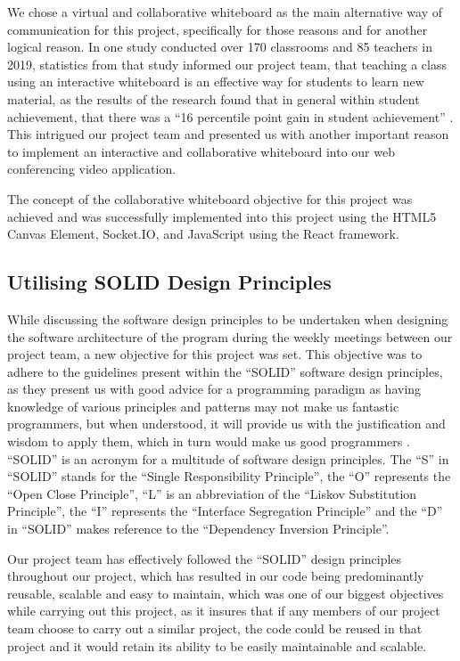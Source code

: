 We chose a virtual and collaborative whiteboard as the main alternative way of communication for this project, specifically for those reasons and for another logical reason. In one study conducted over 170 classrooms and 85 teachers in 2019, statistics from that study informed our project team, that teaching a class using an interactive whiteboard is an effective way for students to learn new material, as the results of the research found that in general within student achievement, that there was a “16 percentile point gain in student achievement” \cite{ marzano2009teaching}. This intrigued our project team and presented us with another important reason to implement an interactive and collaborative whiteboard into our web conferencing video application. 

The concept of the collaborative whiteboard objective for this project was achieved and was successfully implemented into this project using the HTML5 Canvas Element, Socket.IO, and JavaScript using the React framework.
\subsection{Utilising SOLID Design Principles}
While discussing the software design principles to be undertaken when designing the software architecture of the program during the weekly meetings between our project team, a new objective for this project was set. This objective was to adhere to the guidelines present within the “SOLID” software design principles, as they present us with good advice for a programming paradigm as having knowledge of various principles and patterns may not make us fantastic programmers, but when understood, it will provide us with the justification and wisdom to apply them, which in turn would make us good programmers \cite{martin2013getting}. “SOLID” is an acronym for a multitude of software design principles. The “S” in “SOLID” stands for the “Single Responsibility Principle”, the “O” represents the “Open Close Principle”, “L” is an abbreviation of the “Liskov Substitution Principle”, the “I” represents the “Interface Segregation Principle” and the “D” in “SOLID” makes reference to the “Dependency Inversion Principle”.

Our project team has effectively followed the “SOLID” design principles throughout our project, which has resulted in our code being predominantly reusable, scalable and easy to maintain, which was one of our biggest objectives while carrying out this project, as it insures that if any members of our project team choose to carry out a similar project, the code could be reused in that project and it would retain its ability to be easily maintainable and scalable. 

